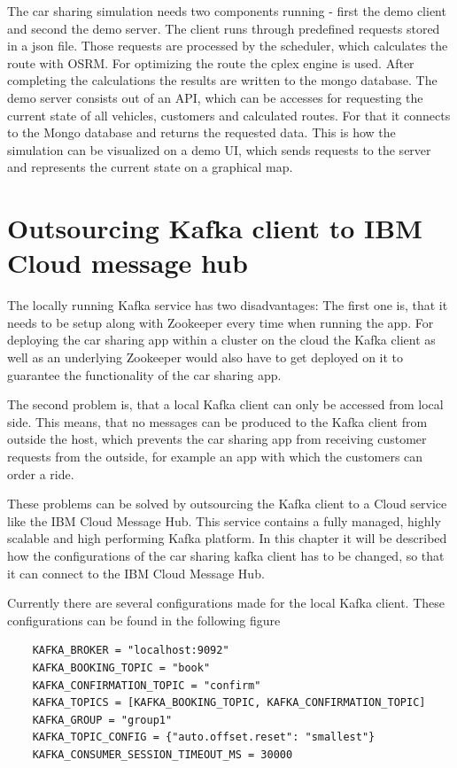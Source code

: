 The car sharing simulation needs two components running - first the demo client and second the demo server. The client runs through predefined requests stored in a json file. Those requests are processed by the scheduler, which calculates the route with OSRM. For optimizing the route the cplex engine is used. After completing the calculations the results are written to the mongo database. The demo server consists out of an API, which can be accesses for requesting the current state of all vehicles, customers and calculated routes. For that it connects to the Mongo database and returns the requested data. This is how the simulation can be visualized on a demo UI, which sends requests to the server and represents the current state on a graphical map.


\section{Outsourcing Kafka client to IBM Cloud message hub}

The locally running Kafka service has two disadvantages: The first one is, that it needs to be setup along with Zookeeper every time when running the app. For deploying the car sharing app within a cluster on the cloud the Kafka client as well as an underlying Zookeeper would also have to get deployed on it to guarantee the functionality of the car sharing app.

The second problem is, that a local Kafka client can only be accessed from local side. This means, that no messages can be produced to the Kafka client from outside the host, which prevents the car sharing app from receiving customer requests from the outside, for example an app with which the customers can order a ride.

These problems can be solved by outsourcing the 	Kafka client to a Cloud service like the IBM Cloud Message Hub. This service contains a fully managed, highly scalable and high performing Kafka platform. In this chapter it will be described how the configurations of the car sharing kafka client has to be changed, so that it can connect to the IBM Cloud Message Hub.


Currently there are several configurations made for the local Kafka client. These configurations can be found in the following figure

\begin{lstlisting}
    KAFKA_BROKER = "localhost:9092"
    KAFKA_BOOKING_TOPIC = "book"
    KAFKA_CONFIRMATION_TOPIC = "confirm"
    KAFKA_TOPICS = [KAFKA_BOOKING_TOPIC, KAFKA_CONFIRMATION_TOPIC]
    KAFKA_GROUP = "group1"
    KAFKA_TOPIC_CONFIG = {"auto.offset.reset": "smallest"}
    KAFKA_CONSUMER_SESSION_TIMEOUT_MS = 30000
\end{lstlisting}

